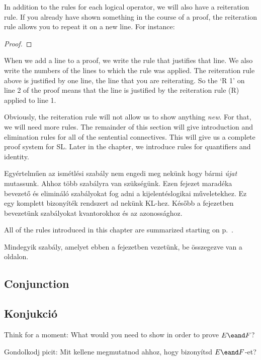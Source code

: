 In addition to the rules for each logical operator, we will also have a reiteration rule. If you already have shown something in the course of a proof, the reiteration rule allows you to repeat it on a new line. For instance:

\begin{proof}
	 
\end{proof}

When we add a line to a proof, we write the rule that justifies that line. We also write the numbers of the lines to which the rule was applied. The reiteration rule above is justified by one line, the line that you are reiterating. So the `R 1' on line 2 of the proof means that the line is justified by the reiteration rule (R) applied to line 1.



Obviously, the reiteration rule will not allow us to show anything \emph{new}. For that, we will need more rules. The remainder of this section will give introduction and elimination rules for all of the sentential connectives. This will give us a complete proof system for SL. Later in the chapter, we introduce rules for quantifiers and identity.

Egyértelműen az ismétlési szabály nem engedi meg nekünk hogy bármi \emph{újat} mutassunk. Ahhoz több szabályra van szükségünk.
Ezen fejezet maradéka bevezető és elimináló szabályokat fog adni a kijelentéslogikai műveletekhez. Ez egy komplett bizonyíték rendszert ad nekünk KL-hez. Később a fejezetben bevezetünk szabályokat kvantorokhoz és az azonossághoz.

All of the rules introduced in this chapter are summarized starting on p.~\pageref{ProofRules}.

Mindegyik szabály, amelyet ebben a fejezetben vezetünk, be összegezve van a ~\pageref{ProofRules} oldalon.

\subsection*{Conjunction}
\subsection{Konjukció}

Think for a moment: What would you need to show in order to prove $E \eand F$?

Gondolkodj picit: Mit kellene megmutatnod ahhoz, hogy bizonyítsd $E \eand F$-et?

